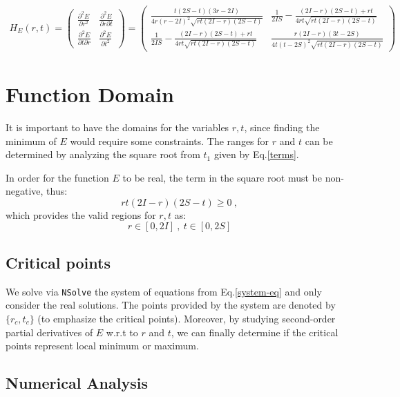 \documentclass[a4paper]{article}
\begin{document}
\begin{align}
H_{E}(r,t) = 
\begin{pmatrix}
\frac{\partial^2 E}{\partial r^2} & \frac{\partial^2 E}{\partial r \partial t} \\
\frac{\partial^2 E}{\partial t \partial r} & \frac{\partial^2 E}{\partial t^2}
\end{pmatrix}
= 
\begin{pmatrix}
\frac{t(2S-t)(3r-2I)}{4r(r-2I)^2\sqrt{rt(2I-r)(2S-t)}} & \frac{1}{2IS} - \frac{(2I-r)(2S-t) + rt}{4rt\sqrt{rt(2I-r)(2S-t)}} \\
\frac{1}{2IS} - \frac{(2I-r)(2S-t) + rt}{4rt\sqrt{rt(2I-r)(2S-t)}} & \frac{r(2I-r)(3t-2S)}{4t(t-2S)^2\sqrt{rt(2I-r)(2S-t)}}
\end{pmatrix}
\end{align}

\section{Function Domain}

It is important to have the domains for the variables $r, t$, since finding the minimum of $E$ would require some constraints. The ranges for $r$ and $t$ can be determined by analyzing the square root from $t_1$ given by Eq.\eqref{terms}.

In order for the function $E$ to be real, the term in the square root must be non-negative, thus:
$$rt(2I-r)(2S-t)\geq 0\ ,$$
which provides the valid regions for $r, t$ as:
$$r\in [0, 2I]\ , \ t\in [0, 2S]$$

\subsection{Critical points}

We solve via \texttt{NSolve} the system of equations from Eq.\eqref{system-eq} and only consider the real solutions. The points provided by the system are denoted by $\{r_c, t_c\}$ (to emphasize the critical points). Moreover, by studying second-order partial derivatives of $E$ w.r.t to $r$ and $t$, we can finally determine if the critical points represent local minimum or maximum.

\subsection*{Numerical Analysis}
\end{document}
